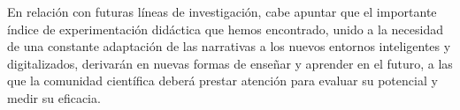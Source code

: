 En relación con futuras líneas de investigación, cabe apuntar que el
importante índice de experimentación didáctica que hemos encontrado,
unido a la necesidad de una constante adaptación de las narrativas a los
nuevos entornos inteligentes y digitalizados, derivarán en nuevas formas
de enseñar y aprender en el futuro, a las que la comunidad científica
deberá prestar atención para evaluar su potencial y medir su eficacia.